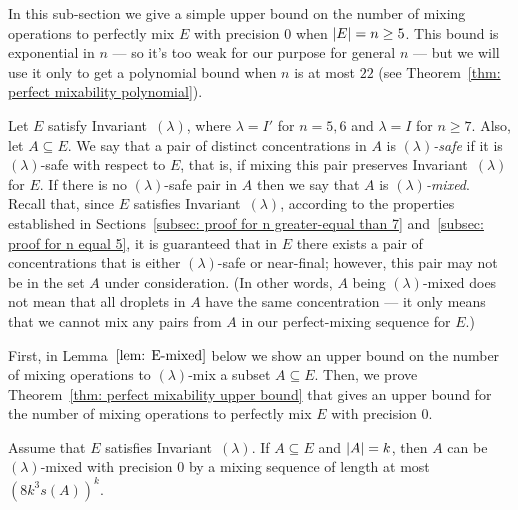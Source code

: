 
%

In this sub-section we give a simple upper bound on the number of mixing operations
to perfectly mix $E$ with precision $0$ when ${|E|}=n\geq 5$.
This bound is exponential in $n$ --- so it's too weak for our purpose for general $n$ --- but we will
use it only to get a polynomial bound when $n$ is at most $22$
(see Theorem~\ref{thm: perfect mixability polynomial}). 

Let $E$ satisfy Invariant~$(\lambda)$, where $\lambda = I'$ for $n=5,6$ and $\lambda = I$ for $n\geq 7$.
Also, let $A\subseteq E$.
We say that a pair of distinct concentrations in $A$ is \emph{$(\lambda)$-safe} 
if it is $(\lambda)$-safe with respect to $E$, that is, if mixing this pair
preserves Invariant~$(\lambda)$ for $E$.
If there is no $(\lambda)$-safe pair in $A$ then we say that $A$ is \emph{$(\lambda)$-mixed}.
Recall that, since $E$ satisfies Invariant~$(\lambda)$, 
according to the properties established in Sections~\ref{subsec: proof for n greater-equal than 7} and~\ref{subsec: proof for n equal 5},
it is guaranteed that in $E$ there exists a pair of concentrations that is either $(\lambda)$-safe
or near-final;
however, this pair may not be in the set $A$ under consideration. 
(In other words, $A$ being $(\lambda)$-mixed does not mean that all droplets in $A$ have the same concentration
--- it only means that we cannot mix any pairs from $A$ in our perfect-mixing sequence for $E$.)


First, in Lemma~$\ref{lem: E-mixed}$ below we show an upper bound on the number of mixing
operations to $(\lambda)$-mix a subset $A\subseteq E$. Then, we prove Theorem~\ref{thm: perfect mixability upper bound}
that gives an upper bound for the number of mixing operations to perfectly mix $E$ with precision $0$.


\begin{lemma}\label{lem: E-mixed}
	Assume that $E$ satisfies Invariant~$(\lambda)$. 
	If $A \subseteq E$ and ${|A|} = k$, 
	then $A$ can be $(\lambda)$-mixed with precision $0$ 
	by a mixing sequence of length at most $(8k^3s(A))^k$.
\end{lemma}

